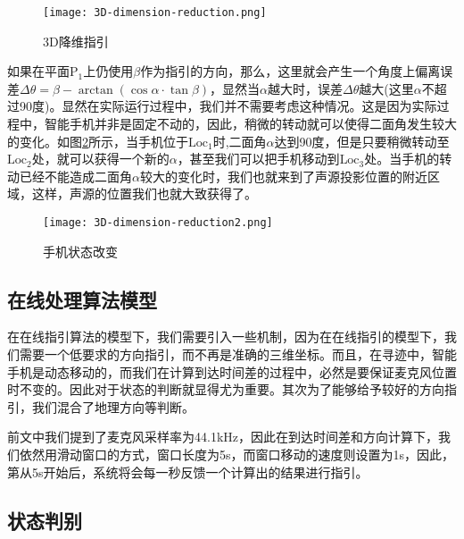 \documentclass[winfonts,oneside]{njuthesis}
\begin{document}
			\begin{figure}[H]
				\centering
				\texttt{[image: 3D-dimension-reduction.png]} 
				\caption{{3D降维指引}}
				\label{fig: 3D-dimension-reduction}
			\end{figure}
			
			如果在平面$\text{P}_1$上仍使用$\beta$作为指引的方向，那么，这里就会产生一个角度上偏离误差$\Delta \theta = \beta - \arctan (\cos \alpha \cdot \tan \beta)$，显然当$\alpha$越大时，误差$\Delta \theta$越大(这里$\alpha$不超过90度)。显然在实际运行过程中，我们并不需要考虑这种情况。这是因为实际过程中，智能手机并非是固定不动的，因此，稍微的转动就可以使得二面角发生较大的变化。如图\ref{fig: 3D-dimension-reduction2}所示，当手机位于$\text{Loc}_1$时,二面角$\alpha$达到90度，但是只要稍微转动至$\text{Loc}_2$处，就可以获得一个新的$\alpha$，甚至我们可以把手机移动到$\text{Loc}_3$处。当手机的转动已经不能造成二面角$\alpha$较大的变化时，我们也就来到了声源投影位置的附近区域，这样，声源的位置我们也就大致获得了。
			
			\begin{figure}[H]
				\centering
				\texttt{[image: 3D-dimension-reduction2.png]} 
				\caption{{手机状态改变}}
				\label{fig: 3D-dimension-reduction2}
			\end{figure}	
		
		\subsection{在线处理算法模型}
			
			在在线指引算法的模型下，我们需要引入一些机制，因为在在线指引的模型下，我们需要一个低要求的方向指引，而不再是准确的三维坐标。而且，在寻迹中，智能手机是动态移动的，而我们在计算到达时间差的过程中，必然是要保证麦克风位置时不变的。因此对于状态的判断就显得尤为重要。其次为了能够给予较好的方向指引，我们混合了地理方向等判断。
			
			前文中我们提到了麦克风采样率为44.1kHz，因此在到达时间差和方向计算下，我们依然用滑动窗口的方式，窗口长度为5s，而窗口移动的速度则设置为1s，因此，第从5s开始后，系统将会每一秒反馈一个计算出的结果进行指引。
			
		\subsection{状态判别}
		
\end{document}
